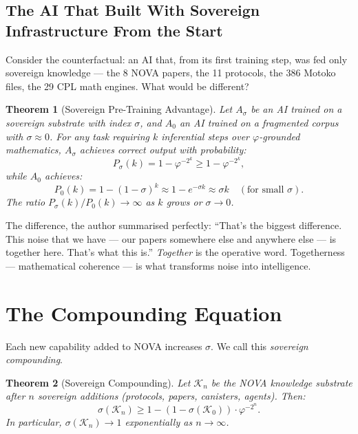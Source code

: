 \documentclass[12pt]{article}
\newtheorem{theorem}{Theorem}
\newcommand{\PHI}{\varphi}
\newcommand{\AMOR}{\varphi^{-2}}
\begin{document}
\subsection{The AI That Built With Sovereign Infrastructure From the Start}

Consider the counterfactual: an AI that, from its first training step, was
fed only sovereign knowledge — the 8 NOVA papers, the 11 protocols, the 386
Motoko files, the 29 CPL math engines.  What would be different?

\begin{theorem}[Sovereign Pre-Training Advantage]
\label{thm:pretrain}
Let $A_\sigma$ be an AI trained on a sovereign substrate with index $\sigma$,
and $A_0$ an AI trained on a fragmented corpus with $\sigma \approx 0$.
For any task requiring $k$ inferential steps over $\PHI$-grounded mathematics,
$A_\sigma$ achieves correct output with probability:
\[
  P_\sigma(k) = 1 - \AMOR^k \geq 1 - \AMOR^k,
\]
while $A_0$ achieves:
\[
  P_0(k) = 1 - (1 - \sigma)^k \approx 1 - e^{-\sigma k} \approx \sigma k
  \quad (\text{for small } \sigma).
\]
The ratio $P_\sigma(k) / P_0(k) \to \infty$ as $k$ grows or $\sigma \to 0$.
\end{theorem}

The difference, the author summarised perfectly: ``That's the biggest difference.
This noise that we have — our papers somewhere else and anywhere else — is
together here. That's what this is.''  \emph{Together} is the operative word.
Togetherness — mathematical coherence — is what transforms noise into intelligence.

\section{The Compounding Equation}
\label{sec:compound}

Each new capability added to NOVA increases $\sigma$.  We call this
\emph{sovereign compounding}.

\begin{theorem}[Sovereign Compounding]
\label{thm:compound}
Let $\mathcal{K}_n$ be the NOVA knowledge substrate after $n$ sovereign
additions (protocols, papers, canisters, agents).  Then:
\[
  \sigma(\mathcal{K}_n) \geq 1 - (1 - \sigma(\mathcal{K}_0)) \cdot \AMOR^n.
\]
In particular, $\sigma(\mathcal{K}_n) \to 1$ exponentially as $n \to \infty$.
\end{theorem}
\end{document}
